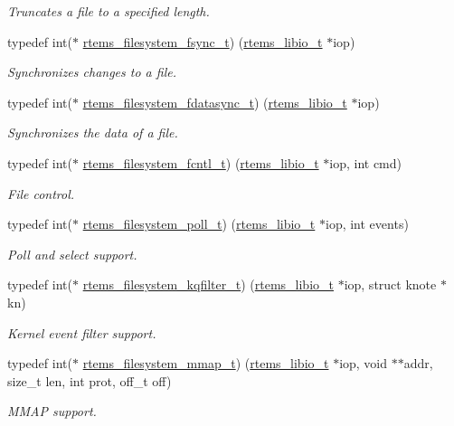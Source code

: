 \begin{DoxyCompactItemize}
\begin{DoxyCompactList}\small\item\em Truncates a file to a specified length. \end{DoxyCompactList}\item 
typedef int($\ast$ \mbox{\hyperlink{group__LibIOFSHandler_gace838c9c108ef6f2e7ddeed186a369f5}{rtems\+\_\+filesystem\+\_\+fsync\+\_\+t}}) (\mbox{\hyperlink{structrtems__libio__tt}{rtems\+\_\+libio\+\_\+t}} $\ast$iop)
\begin{DoxyCompactList}\small\item\em Synchronizes changes to a file. \end{DoxyCompactList}\item 
typedef int($\ast$ \mbox{\hyperlink{group__LibIOFSHandler_gad78b9605ac97be914b586f3a2820a3de}{rtems\+\_\+filesystem\+\_\+fdatasync\+\_\+t}}) (\mbox{\hyperlink{structrtems__libio__tt}{rtems\+\_\+libio\+\_\+t}} $\ast$iop)
\begin{DoxyCompactList}\small\item\em Synchronizes the data of a file. \end{DoxyCompactList}\item 
typedef int($\ast$ \mbox{\hyperlink{group__LibIOFSHandler_ga4af1bd820051eb2fc74b91f5d8868e06}{rtems\+\_\+filesystem\+\_\+fcntl\+\_\+t}}) (\mbox{\hyperlink{structrtems__libio__tt}{rtems\+\_\+libio\+\_\+t}} $\ast$iop, int cmd)
\begin{DoxyCompactList}\small\item\em File control. \end{DoxyCompactList}\item 
typedef int($\ast$ \mbox{\hyperlink{group__LibIOFSHandler_ga0e8056cf6051bb275005b03e74d0ff5d}{rtems\+\_\+filesystem\+\_\+poll\+\_\+t}}) (\mbox{\hyperlink{structrtems__libio__tt}{rtems\+\_\+libio\+\_\+t}} $\ast$iop, int events)
\begin{DoxyCompactList}\small\item\em Poll and select support. \end{DoxyCompactList}\item 
typedef int($\ast$ \mbox{\hyperlink{group__LibIOFSHandler_ga8d33b578b98ea48ea8f2282632e01e72}{rtems\+\_\+filesystem\+\_\+kqfilter\+\_\+t}}) (\mbox{\hyperlink{structrtems__libio__tt}{rtems\+\_\+libio\+\_\+t}} $\ast$iop, struct knote $\ast$kn)
\begin{DoxyCompactList}\small\item\em Kernel event filter support. \end{DoxyCompactList}\item 
typedef int($\ast$ \mbox{\hyperlink{group__LibIOFSHandler_gadfd939c2b1e61acd15671a288a259e96}{rtems\+\_\+filesystem\+\_\+mmap\+\_\+t}}) (\mbox{\hyperlink{structrtems__libio__tt}{rtems\+\_\+libio\+\_\+t}} $\ast$iop, void $\ast$$\ast$addr, size\+\_\+t len, int prot, off\+\_\+t off)
\begin{DoxyCompactList}\small\item\em M\+M\+AP support. \end{DoxyCompactList}\end{DoxyCompactItemize}
